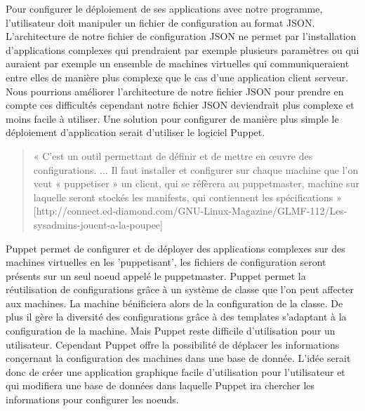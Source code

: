 \documentclass{report}
\begin{document}
    
    Pour configurer le déploiement de ses applications avec notre programme, l'utilisateur doit manipuler un fichier de configuration au format JSON.
    L'architecture de notre fichier de configuration JSON ne permet par l'installation d'applications complexes qui prendraient par exemple plusieurs paramètres ou qui auraient par exemple un ensemble de machines virtuelles qui communiqueraient entre elles de manière plus complexe que le cas d'une application client serveur.
    Nous pourrions améliorer l'architecture de notre fichier JSON pour prendre en compte ces difficultés cependant notre fichier JSON deviendrait plus complexe et moins facile à utiliser.
    Une solution pour configurer de manière plus simple le déploiement d'application serait d'utiliser le logiciel Puppet.
    \begin{quote}
        « C'est un outil permettant de définir et de mettre en œuvre des configurations.
        ...
       Il faut installer et configurer sur chaque machine que l'on veut « puppetiser » un client, qui se réfèrera au puppetmaster, machine sur laquelle seront stockés les manifests, qui contiennent les spécifications »
        [http://connect.ed-diamond.com/GNU-Linux-Magazine/GLMF-112/Les-sysadmins-jouent-a-la-poupee]
    \end{quote}
    Puppet permet de configurer et de déployer des applications complexes sur des machines virtuelles en les 'puppetisant', les fichiers de configuration seront présents sur un seul noeud appelé le puppetmaster.
    Puppet permet la réutilisation de configurations grâce à un système de classe que l'on peut affecter aux machines. La machine bénificiera alors de la configuration de la classe. De plus il gère la diversité des configurations grâce à des templates s'adaptant à la configuration de la machine.
    Mais Puppet reste difficile d'utilisation pour un utilisateur.
    Cependant Puppet offre la possibilité de déplacer
    les informations conçernant la configuration des machines dans une base de donnée.
    L'idée serait donc de créer une application graphique facile d'utilisation pour l'utilisateur et qui modifiera une base de données dans laquelle Puppet ira chercher les informations pour configurer les noeuds.



            
\end{document}
